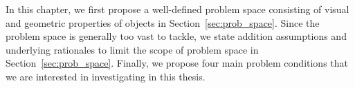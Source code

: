 In this chapter, we first propose a well-defined problem space consisting of visual and geometric properties of objects in Section~\ref{sec:prob_space}. Since the problem space is generally too vast to tackle, we state addition assumptions and underlying rationales to limit the scope of problem space in Section~\ref{sec:prob_space}. Finally, we propose four main problem conditions that we are interested in investigating in this thesis.



